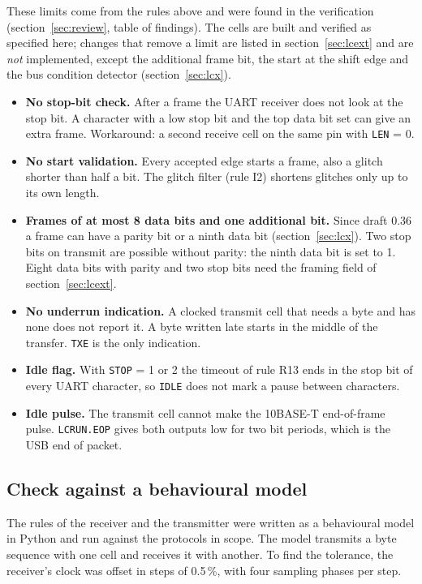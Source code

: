 \documentclass[10pt,a4paper]{article}
\newcommand{\reg}[1]{\texttt{#1}}
\begin{document}
These limits come from the rules above and were found in the verification (section~\ref{sec:review}, table of
findings). The cells are built and verified as specified here; changes that remove a limit are listed in
section~\ref{sec:lcext} and are \emph{not} implemented, except the additional frame bit, the start at the shift edge and the bus condition detector (section~\ref{sec:lcx}).
\begin{itemize}
\item \textbf{No stop-bit check.} After a frame the UART receiver does not look at the stop bit. A character
with a low stop bit and the top data bit set can give an extra frame. Workaround: a second receive cell on
the same pin with \reg{LEN} = 0.
\item \textbf{No start validation.} Every accepted edge starts a frame, also a glitch shorter than half a bit.
The glitch filter (rule I2) shortens glitches only up to its own length.
\item \textbf{Frames of at most 8 data bits and one additional bit.} Since draft 0.36 a frame can have a parity bit or a ninth data bit (section~\ref{sec:lcx}). Two stop bits on transmit are possible without parity: the ninth data bit is set to 1. Eight data bits with parity and two stop bits need the framing field of section~\ref{sec:lcext}.
\item \textbf{No underrun indication.} A clocked transmit cell that needs a byte and has none does not report
it. A byte written late starts in the middle of the transfer. \reg{TXE} is the only indication.
\item \textbf{Idle flag.} With \reg{STOP} = 1 or 2 the timeout of rule R13 ends in the stop bit of every UART
character, so \reg{IDLE} does not mark a pause between characters.
\item \textbf{Idle pulse.} The transmit cell cannot make the 10BASE-T end-of-frame pulse. \reg{LCRUN.EOP} gives
both outputs low for two bit periods, which is the USB end of packet.
\end{itemize}

\subsection{Check against a behavioural model}\label{sec:lcchk}

The rules of the receiver and the transmitter were written as a behavioural model in Python and run against the
protocols in scope. The model transmits a byte sequence with one cell and receives it with another. To find the
tolerance, the receiver's clock was offset in steps of 0.5\,\%, with four sampling phases per step.
\end{document}
